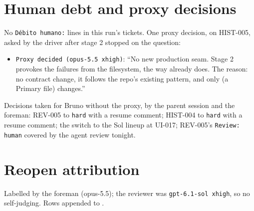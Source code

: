 \documentclass[11pt,a4paper]{article}
\begin{document}
\section*{Human debt and proxy decisions}

No \texttt{Débito humano:} lines in this run's tickets. One proxy decision, on HIST-005, asked by
the driver after stage 2 stopped on the question:

\begin{itemize}
  \item \texttt{Proxy decided (opus-5.5 xhigh)}: ``No new production seam. Stage 2 provokes the
        failures from the filesystem, the way  already does. The
        reason: no contract change, it follows the repo's existing pattern, and only
         (a Primary file) changes.''
\end{itemize}

Decisions taken for Bruno without the proxy, by the parent session and the foreman: REV-005 to
\texttt{hard} with a resume comment; HIST-004 to \texttt{hard} with a resume comment; the switch
to the Sol lineup at UI-017; REV-005's \texttt{Review: human} covered by the agent review tonight.

\section*{Reopen attribution}

Labelled by the foreman (opus-5.5); the reviewer was \texttt{gpt-6.1-sol xhigh}, so no
self-judging. Rows appended to .
\end{document}
